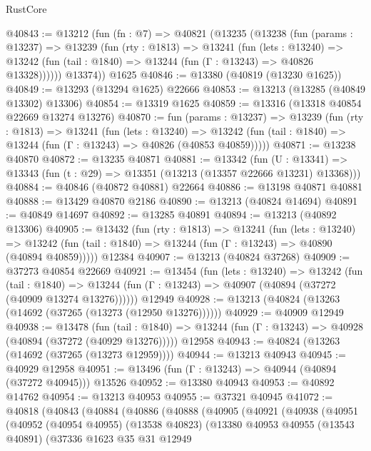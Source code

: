 \begin{lexlean}{RustCore}
\begin{coremodule}
@40843 := @13212
    (fun (fn : @7) =>
    @40821
      (@13235
        (@13238
          (fun (params : @13237) =>
          @13239
            (fun (rty : @1813) =>
            @13241
              (fun (lets : @13240) =>
              @13242 (fun (tail : @1840) => @13244 (fun (Γ : @13243) => @40826 @13328))))))
        @13374))
    @1625
@40846 := @13380 (@40819 (@13230 @1625))
@40849 := @13293 (@13294 @1625) @22666
@40853 := @13213 (@13285 (@40849 @13302) @13306)
@40854 := @13319 @1625
@40859 := @13316 (@13318 @40854 @22669 @13274 @13276)
@40870 := fun (params : @13237) =>
  @13239
    (fun (rty : @1813) =>
    @13241
      (fun (lets : @13240) =>
      @13242 (fun (tail : @1840) => @13244 (fun (Γ : @13243) => @40826 (@40853 @40859)))))
@40871 := @13238 @40870
@40872 := @13235 @40871
@40881 := @13342
    (fun (U : @13341) => @13343 (fun (t : @29) => @13351 (@13213 (@13357 @22666 @13231) @13368)))
@40884 := @40846 (@40872 @40881) @22664
@40886 := @13198 @40871 @40881
@40888 := @13429 @40870 @2186
@40890 := @13213 (@40824 @14694)
@40891 := @40849 @14697
@40892 := @13285 @40891
@40894 := @13213 (@40892 @13306)
@40905 := @13432
    (fun (rty : @1813) =>
    @13241
      (fun (lets : @13240) =>
      @13242 (fun (tail : @1840) => @13244 (fun (Γ : @13243) => @40890 (@40894 @40859)))))
    @12384
@40907 := @13213 (@40824 @37268)
@40909 := @37273 @40854 @22669
@40921 := @13454
    (fun (lets : @13240) =>
    @13242
      (fun (tail : @1840) =>
      @13244 (fun (Γ : @13243) => @40907 (@40894 (@37272 (@40909 @13274 @13276))))))
    @12949
@40928 := @13213 (@40824 (@13263 (@14692 (@37265 (@13273 (@12950 @13276))))))
@40929 := @40909 @12949
@40938 := @13478
    (fun (tail : @1840) => @13244 (fun (Γ : @13243) => @40928 (@40894 (@37272 (@40929 @13276)))))
    @12958
@40943 := @40824 (@13263 (@14692 (@37265 (@13273 @12959))))
@40944 := @13213 @40943
@40945 := @40929 @12958
@40951 := @13496 (fun (Γ : @13243) => @40944 (@40894 (@37272 @40945))) @13526
@40952 := @13380 @40943
@40953 := @40892 @14762
@40954 := @13213 @40953
@40955 := @37321 @40945
@41072 := @40818
    (@40843
      (@40884
        (@40886
          (@40888
            (@40905
              (@40921
                (@40938
                  (@40951
                    (@40952
                      (@40954 @40955)
                      (@13538 @40823)
                      (@13380
                        @40953
                        @40955
                        (@13543 @40891)
                        (@37336
                          @1623
                          @35
                          @31
                          @12949

\end{coremodule}
\end{lexlean}
